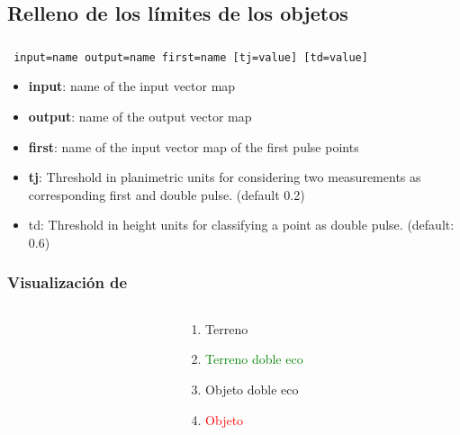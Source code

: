 \subsection{Relleno de los límites de los objetos}
\begin{frame}[shrink=03]
 \frametitle{}
\begin{beamerboxesrounded}[shadow=true]{\textbf{}\texttt{ input=name output=name first=name [tj=value] [td=value]}}
\begin{itemize}
 \item \textbf{input}: name of the input vector map
 \item \textbf{output}: name of the output vector map
 \item \textbf{first}: name of the input vector map of the first pulse points
 \item \textbf{tj}: Threshold in planimetric units for considering two measurements as corresponding first and double pulse. (default
0.2)
 \item td: Threshold in height units for classifying a point as double pulse. (default: 0.6)
\end{itemize}
\end{beamerboxesrounded}
\vgrow
\end{frame}
\pgfdeclareimage[width=0.55\textwidth]{grow}{images/grow}
\begin{frame}
 \frametitle{Visualización de \LARGE{}}
\begin{columns}
  \begin{column}{0.65\textwidth}
    \begin{center}
   \end{center}
  \end{column}
  \begin{column}{0.35\textwidth}
	\begin{enumerate}
	 \item \textcolor{yellow!95!black}{Terreno}
	 \item \textcolor{green}{Terreno doble eco}
	 \item \textcolor{blue!90!black}{Objeto doble eco}
	 \item \textcolor{red}{Objeto}
	\end{enumerate}
  \end{column}
\end{columns}
\end{frame}
